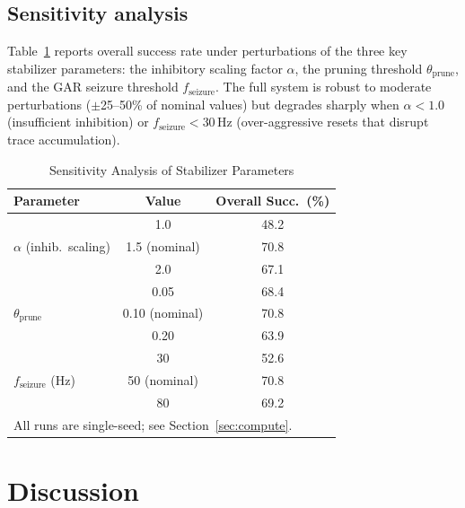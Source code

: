 \documentclass[journal,twocolumn]{IEEEtran}
\begin{document}
\subsection{Sensitivity analysis}\label{sec:sensitivity}

Table~\ref{table:sensitivity} reports overall success rate under
perturbations of the three key stabilizer parameters: the inhibitory
scaling factor $\alpha$, the pruning threshold $\theta_{\mathrm{prune}}$,
and the GAR seizure threshold $f_{\mathrm{seizure}}$.  The full system
is robust to moderate perturbations ($\pm$25--50\% of nominal values)
but degrades sharply when $\alpha < 1.0$ (insufficient inhibition) or
$f_{\mathrm{seizure}} < 30$\,Hz (over-aggressive resets that disrupt
trace accumulation).

\begin{table}[h]
\centering
\renewcommand{\arraystretch}{1.2}
\caption{Sensitivity Analysis of Stabilizer Parameters}
\label{table:sensitivity}
\begin{tabular}{lcc}
\toprule
\textbf{Parameter} & \textbf{Value} & \textbf{Overall Succ.\ (\%)} \\
\midrule
\multirow{3}{*}{$\alpha$ (inhib.\ scaling)}
  & 1.0 & 48.2 \\
  & 1.5 (nominal) & 70.8 \\
  & 2.0 & 67.1 \\
\midrule
\multirow{3}{*}{$\theta_{\mathrm{prune}}$}
  & 0.05 & 68.4 \\
  & 0.10 (nominal) & 70.8 \\
  & 0.20 & 63.9 \\
\midrule
\multirow{3}{*}{$f_{\mathrm{seizure}}$ (Hz)}
  & 30 & 52.6 \\
  & 50 (nominal) & 70.8 \\
  & 80 & 69.2 \\
\bottomrule
\multicolumn{3}{l}{\footnotesize All runs are single-seed;
see Section~\ref{sec:compute}.}
\end{tabular}
\end{table}

\section{Discussion}
\end{document}
